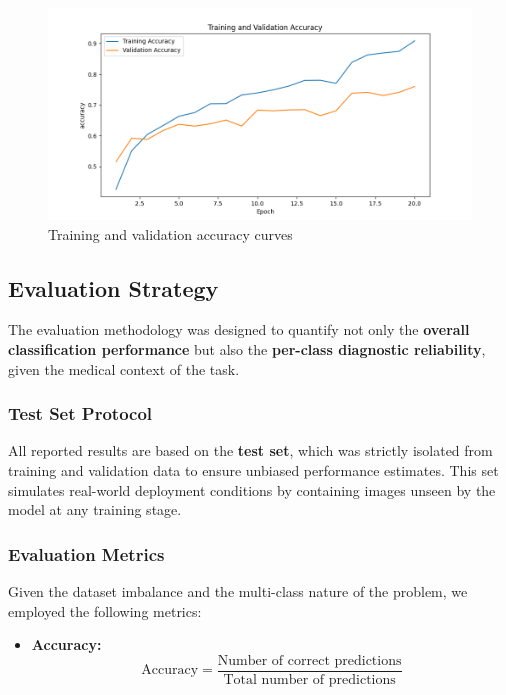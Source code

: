 \documentclass[
  12pt,
  oneside]{article}
\providecommand{\tightlist}{%
  \setlength{\itemsep}{0pt}\setlength{\parskip}{0pt}}
\begin{document}
\begin{figure}

{\centering \includegraphics[width=0.9\linewidth]{accuracy_curve_v3} 

}

\caption{Training and validation accuracy curves}\label{fig:unnamed-chunk-6}
\end{figure}

\subsection{Evaluation Strategy}\label{evaluation-strategy}

The evaluation methodology was designed to quantify not only the
\textbf{overall classification performance} but also the
\textbf{per-class diagnostic reliability}, given the medical context of
the task.

\subsubsection{Test Set Protocol}\label{test-set-protocol}

All reported results are based on the \textbf{test set}, which was
strictly isolated from training and validation data to ensure unbiased
performance estimates. This set simulates real-world deployment
conditions by containing images unseen by the model at any training
stage.

\subsubsection{Evaluation Metrics}\label{evaluation-metrics}

Given the dataset imbalance and the multi-class nature of the problem,
we employed the following metrics:

\begin{itemize}
\tightlist
\item
  \textbf{Accuracy:} \[
  \text{Accuracy} = \frac{\text{Number of correct predictions}}{\text{Total number of predictions}}
  \]
\end{itemize}
\end{document}
